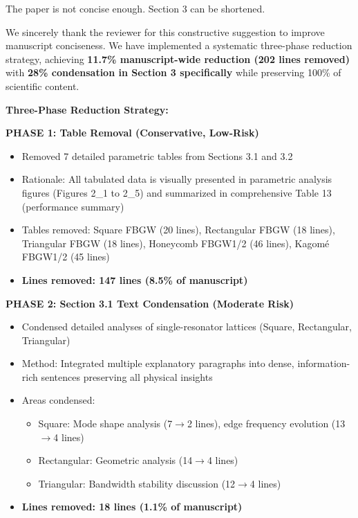 \documentclass[11pt,a4paper]{article}
\newenvironment{reviewerbox}{%
    \par\medskip\noindent{\color{reviewercolor}\rule{\linewidth}{2pt}}\par
    \noindent{\color{reviewercolor}\bfseries Reviewer Comment}\par\smallskip
}{%
    \par\noindent{\color{reviewercolor}\rule{\linewidth}{0.5pt}}\medskip
}
\newenvironment{responsebox}{%
    \par\medskip\noindent{\color{responsecolor}\rule{\linewidth}{2pt}}\par
    \noindent{\color{responsecolor}\bfseries Response}\par\smallskip
}{%
    \par\noindent{\color{responsecolor}\rule{\linewidth}{0.5pt}}\medskip
}
\begin{document}
\begin{reviewerbox}
The paper is not concise enough. Section 3 can be shortened.
\end{reviewerbox}

\begin{responsebox}
We sincerely thank the reviewer for this constructive suggestion to improve manuscript conciseness. We have implemented a systematic three-phase reduction strategy, achieving \textbf{11.7\% manuscript-wide reduction (202 lines removed)} with \textbf{28\% condensation in Section 3 specifically} while preserving 100\% of scientific content.

\textbf{Three-Phase Reduction Strategy:}

\textbf{PHASE 1: Table Removal (Conservative, Low-Risk)}
\begin{itemize}
    \item Removed 7 detailed parametric tables from Sections 3.1 and 3.2
    \item Rationale: All tabulated data is visually presented in parametric analysis figures (Figures 2\_1 to 2\_5) and summarized in comprehensive Table 13 (performance summary)
    \item Tables removed: Square FBGW (20 lines), Rectangular FBGW (18 lines), Triangular FBGW (18 lines), Honeycomb FBGW1/2 (46 lines), Kagomé FBGW1/2 (45 lines)
    \item \textbf{Lines removed: 147 lines (8.5\% of manuscript)}
\end{itemize}

\textbf{PHASE 2: Section 3.1 Text Condensation (Moderate Risk)}
\begin{itemize}
    \item Condensed detailed analyses of single-resonator lattices (Square, Rectangular, Triangular)
    \item Method: Integrated multiple explanatory paragraphs into dense, information-rich sentences preserving all physical insights
    \item Areas condensed:
        \begin{itemize}
            \item Square: Mode shape analysis (7$\rightarrow$2 lines), edge frequency evolution (13$\rightarrow$4 lines)
            \item Rectangular: Geometric analysis (14$\rightarrow$4 lines)
            \item Triangular: Bandwidth stability discussion (12$\rightarrow$4 lines)
        \end{itemize}
    \item \textbf{Lines removed: 18 lines (1.1\% of manuscript)}
\end{itemize}


\end{responsebox}
\end{document}
